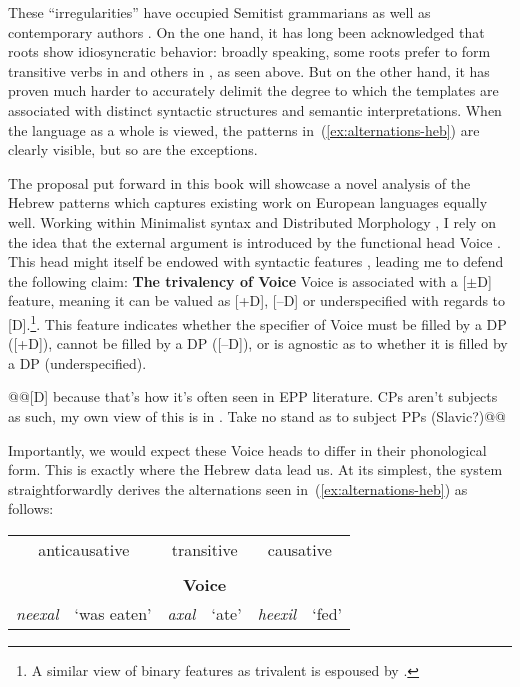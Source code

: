 These ``irregularities'' have occupied Semitist grammarians as well as contemporary authors \citep{doron03,arad05,borer13oup,kastner16phd}. On the one hand, it has long been acknowledged that roots show idiosyncratic behavior: broadly speaking, some roots prefer to form transitive verbs in {\tkal} and others in {\tpie}, as seen above. But on the other hand, it has proven much harder to accurately delimit the degree to which the templates are associated with distinct syntactic structures and semantic interpretations. When the language as a whole is viewed, the patterns in~(\ref{ex:alternations-heb}) are clearly visible, but so are the exceptions.

The proposal put forward in this book will showcase a novel analysis of the Hebrew patterns which captures existing work on European languages equally well. Working within Minimalist syntax \citep{chomsky95} and Distributed Morphology \citep{dm}, I rely on the idea that the external argument is introduced by the functional head Voice \citep{kratzer96,pylkkanen08,woodmarantz17}. This head might itself be endowed with syntactic features \citep{schaefer08,wood15springer}, leading me to defend the following claim:
\pex \textbf{The trivalency of Voice}
	\a Voice is associated with a [$\pm$D] feature, meaning it can be valued as [+D], [--D] or underspecified with regards to [D].\footnote{A similar view of binary features as trivalent is espoused by \cite{harbour11}.}.
	\a This feature indicates whether the specifier of Voice must be filled by a DP ([+D]), cannot be filled by a DP ([--D]), or is agnostic as to whether it is filled by a DP (underspecified).
\xe

@@[D] because that's how it's often seen in EPP literature. CPs aren't subjects as such, my own view of this is in \cite{kastner15lingua}. Take no stand as to subject PPs (Slavic?)@@

Importantly, we would expect these Voice heads to differ in their phonological form. This is exactly where the Hebrew data lead us. At its simplest, the system straightforwardly derives the alternations seen in~(\ref{ex:alternations-heb}) as follows:
\ex\label{ex:alternations-heb2}
	\begin{tabular}{llllll}
	\multicolumn{2}{c}{anticausative}	&	\multicolumn{2}{c}{transitive}	& \multicolumn{2}{c}{causative}\\
	\multicolumn{2}{c}{\tnif}	&	\multicolumn{2}{c}{\tkal}	& \multicolumn{2}{c}{\thif}\\
	\multicolumn{2}{c}{\textbf{\vz}}	&	\multicolumn{2}{c}{\textbf{Voice}}	& \multicolumn{2}{c}{\textbf{\vd}}\\
	\emph{neexal}	& `was eaten'	&	\emph{axal}	& `ate'	&	\emph{heexil}	& `fed'\\
	\end{tabular}
\xe

